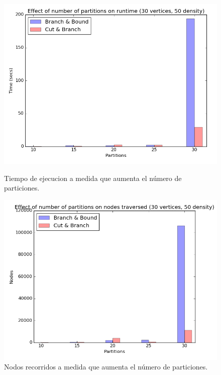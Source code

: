 \begin{figure}[h]
  \centering
  \begin{minipage}[b]{0.49\textwidth}
    \includegraphics[width=\textwidth]{img/3-partitions_v30_d50_i1_co0_l40_t1_b0.png}
    \caption{Tiempo de ejecucion a medida que aumenta el número de particiones.}
  \end{minipage}
  \hfill
  \begin{minipage}[b]{0.49\textwidth}
    \includegraphics[width=\textwidth]{img/3-partitions_v30_d50_i1_co0_l40_t1_b0_nodes.png}
    \caption{Nodos recorridos a medida que aumenta el número de particiones.}
  \end{minipage}
\end{figure}

